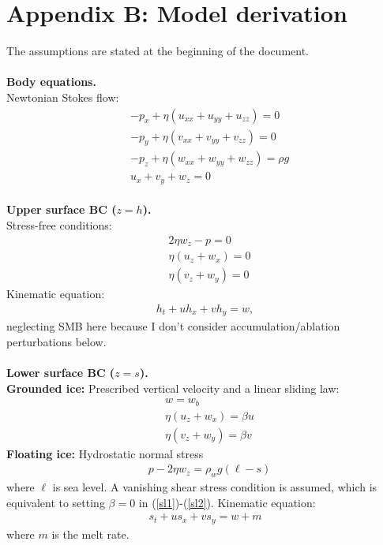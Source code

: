 \documentclass[paper=a4, fontsize=11pt]{article}
\begin{document}
\section*{Appendix B: Model derivation}
The assumptions are stated at the beginning of the document.\\ \\
\noindent\textbf{Body equations.}\\
Newtonian Stokes flow:
\begin{align}
&-p_x + \eta ( u_{xx} +u_{yy} + u_{zz}) = 0  \\
&-p_y + \eta ( v_{xx}+v_{yy} + v_{zz}) = 0 \\
&-p_z + \eta ( w_{xx} +w_{yy} + w_{zz}) = \rho g \\
&u_x + v_y + w_z = 0
\end{align}
\\
\noindent\textbf{Upper surface BC ($z=h$).}\\
Stress-free conditions:
\begin{align}
&2\eta w_z - p = 0 \\
&\eta(u_z +w_x) = 0 \\
&\eta(v_z +w_y) = 0
\end{align}
Kinematic equation:
\begin{align}
h_t + uh_x + vh_y = w,
\end{align}
neglecting SMB here because I don't consider accumulation/ablation perturbations below.
\\  \\
\noindent\textbf{Lower surface BC ($z=s$).}\\
\textbf{Grounded ice:}
Prescribed vertical velocity and a linear sliding law:
\begin{align}
&w  = w_b\\
&\eta(u_z + w_x) = \beta u \label{sl1} \\
&\eta(v_z + w_y) = \beta v \label{sl2}
\end{align}
\textbf{Floating ice:}
Hydrostatic normal stress
\begin{align}
&p-2\eta w_z  = \rho_w g(\ell-s)
\end{align}
where $\ell$ is sea level. A vanishing shear stress condition is assumed,
which is equivalent to setting $\beta=0$ in (\ref{sl1})-(\ref{sl2}).
\noindent Kinematic equation:
\begin{align}
s_t + us_x + vs_y  = w + m
\end{align}
where $m$ is the melt rate.\\ \\
\end{document}
